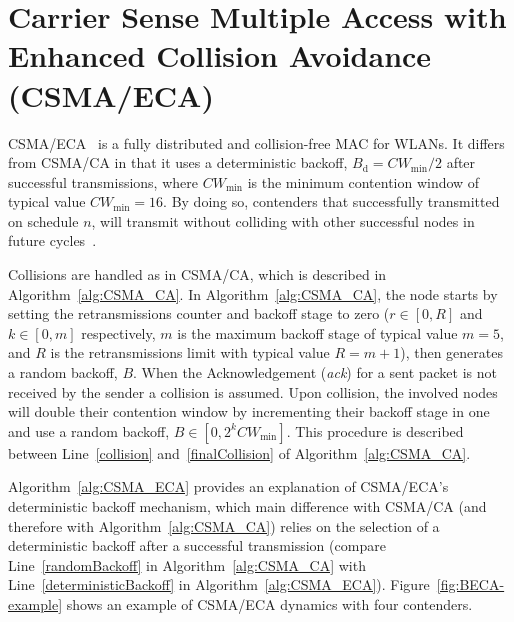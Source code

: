 \section{Carrier Sense Multiple Access with Enhanced Collision Avoidance (CSMA/ECA)}\label{introProtocol}

CSMA/ECA~\cite{barcelo2008lba} is a fully distributed and collision-free MAC for WLANs. It differs from CSMA/CA in that it uses a deterministic backoff, $B_{\text{d}}=CW_{\min}/2$ after successful transmissions, where $CW_{\min}$ is the minimum contention window of typical value $CW_{\min}=16$. By doing so, contenders that successfully transmitted on schedule $n$, will transmit without colliding with other successful nodes in future cycles~\cite{HE}.

Collisions are handled as in CSMA/CA, which is described in Algorithm~\ref{alg:CSMA_CA}. In Algorithm~\ref{alg:CSMA_CA}, the node starts by setting the retransmissions counter and backoff stage to zero ($r\in[0,R]$ and $k\in[0,m]$ respectively, $m$ is the maximum backoff stage of typical value $m=5$, and $R$ is the retransmissions limit with typical value $R=m+1$), then generates a random backoff, $B$. When the Acknowledgement (\emph{ack}) for a sent packet is not received by the sender a collision is assumed. Upon collision, the involved nodes will double their contention window by incrementing their backoff stage in one and use a random backoff, $B\in[0,2^{k}CW_{\min}]$. This procedure is described between Line~\ref{collision} and~\ref{finalCollision} of Algorithm~\ref{alg:CSMA_CA}.

Algorithm~\ref{alg:CSMA_ECA} provides an explanation of CSMA/ECA's deterministic backoff mechanism, which main difference with CSMA/CA (and therefore with Algorithm~\ref{alg:CSMA_CA}) relies on the selection of a deterministic backoff after a successful transmission (compare Line~\ref{randomBackoff} in Algorithm~\ref{alg:CSMA_CA} with Line~\ref{deterministicBackoff} in Algorithm~\ref{alg:CSMA_ECA}). Figure~\ref{fig:BECA-example} shows an example of CSMA/ECA dynamics with four contenders.

